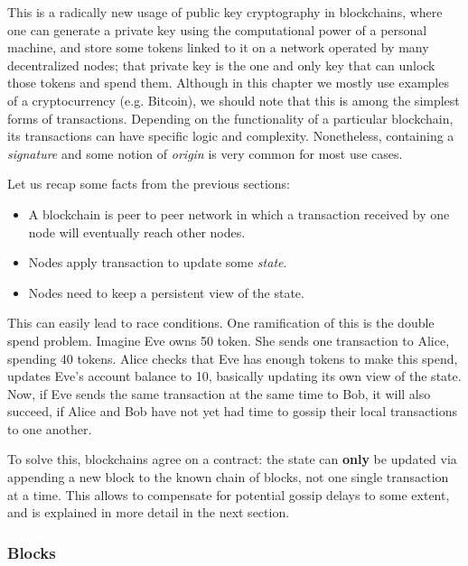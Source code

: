 This is a radically new usage of public key cryptography in blockchains, where one can generate a
private key using the computational power of a personal machine, and store some tokens linked to it on a
network operated by many decentralized nodes; that private key is the one and only key that can
unlock those tokens and spend them. Although in this chapter we mostly use examples of a
cryptocurrency (e.g. Bitcoin), we should note that this is among the simplest forms of transactions.
Depending on the functionality of a particular blockchain, its transactions can have specific logic
and complexity. Nonetheless, containing a \textit{signature} and some notion of \textit{origin} is
very common for most use cases.

Let us recap some facts from the previous sections:

\begin{itemize}
	\item A blockchain is peer to peer network in which a transaction received by one node will
	eventually reach other nodes.
	\item Nodes apply transaction to update some \textit{state}.
	\item Nodes need to keep a persistent view of the state.
\end{itemize}

This can easily lead to race conditions. One ramification of this is the double spend problem.
Imagine Eve owns 50 token. She sends one transaction to Alice, spending 40 tokens. Alice checks that
Eve has enough tokens to make this spend, updates Eve's account balance to 10, basically updating its
own view of the state. Now, if Eve sends the same transaction at the same time to Bob, it will also
succeed, if Alice and Bob have not yet had time to gossip their local transactions to one another.

To solve this, blockchains agree on a contract: the state can \textbf{only} be updated via appending
a new block to the known chain of blocks, not one single transaction at a time. This allows to
compensate for potential gossip delays to some extent, and is explained in more detail in the
next section.

\subsubsection{Blocks} \label{chap_bg:subsec:block}

